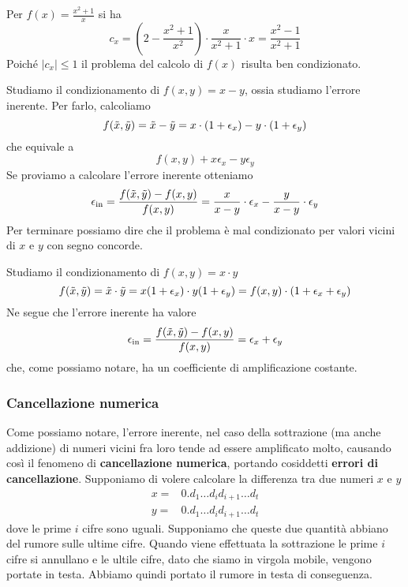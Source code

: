 \begin{example}
	Per $f(x) = \frac{x^2 + 1}{x}$ si ha
	\[
		c_x = \left( 2 - \frac{x^2 + 1}{x^2} \right) \cdot \frac{x}{x^2 + 1} \cdot x =
		\frac{x^2 - 1}{x^2 + 1}
	\]
	Poiché $|c_x| \leq 1$ il problema del calcolo di $f(x)$ risulta ben condizionato.
\end{example}

\begin{example}
	Studiamo il condizionamento di $f(x, y) = x - y$, ossia studiamo l'errore inerente. Per farlo, calcoliamo
	\[ f(\tilde{x}, \tilde{y}) = \tilde{x} - \tilde{y} = x \cdot (1 + \epsilon_x) - y \cdot (1 + \epsilon_y) \]
	che equivale a
	\[ f(x, y) + x \epsilon_x - y \epsilon_y \]
	Se proviamo a calcolare l'errore inerente otteniamo
	\[
		\epsilon_\text{in} = \frac{f(\tilde{x}, \tilde{y}) - f(x, y)}{f(x, y)} =
		\frac{x}{x - y} \cdot \epsilon_x - \frac{y}{x - y} \cdot \epsilon_y
	\]
	Per terminare possiamo dire che il problema è mal condizionato per valori vicini di $x$ e $y$ con segno
	concorde.
\end{example}

\begin{example}
	Studiamo il condizionamento di $f(x, y) = x\cdot y$
	\[
		f(\tilde{x}, \tilde{y}) = \tilde{x} \cdot \tilde{y} = x (1 + \epsilon_x) \cdot y (1 + \epsilon_y) =
		f(x, y) \cdot (1 + \epsilon_x + \epsilon_y)
	\]
	Ne segue che l'errore inerente ha valore
	\[ \epsilon_\text{in} = \frac{f(\tilde{x}, \tilde{y}) - f(x, y)}{f(x, y)} = \epsilon_x + \epsilon_y \]
	che, come possiamo notare, ha un coefficiente di amplificazione costante.
\end{example}

\subsubsection{Cancellazione numerica}
Come possiamo notare, l'errore inerente, nel caso della sottrazione (ma anche addizione) di numeri vicini fra
loro tende ad essere amplificato molto, causando così il fenomeno di \textbf{cancellazione numerica}, portando
cosiddetti \textbf{errori di cancellazione}. Supponiamo di volere calcolare la differenza tra due numeri $x$
e $y$
\begin{align*}
	x = & 0. d_1 \dots d_i d_{i+1} \dots d_t \\
	y = & 0. d_1 \dots d_i d_{i+1} \dots d_t
\end{align*}
dove le prime $i$ cifre sono uguali. Supponiamo che queste due quantità abbiano del rumore sulle ultime cifre.
Quando viene effettuata la sottrazione le prime $i$ cifre si annullano e le ultile cifre, dato che siamo in
virgola mobile, vengono portate in testa. Abbiamo quindi portato il rumore in testa di conseguenza.

